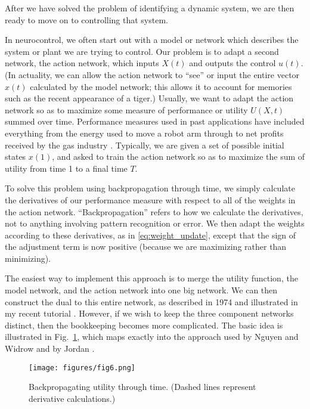 \documentclass[journal]{IEEEtran} %
\begin{document}
After we have solved the problem of identifying a dynamic system, we are then ready to move on to controlling that system.

In neurocontrol, we often start out with a model or network which describes the system or plant we are trying to control. Our problem is to adapt a second network, the action network, which inputs $X(t)$ and outputs the control $u(t)$. (In actuality, we can allow the action network to ``see'' or input the entire vector $x(t)$ calculated by the model network; this allows it to account for memories such as the recent appearance of a tiger.) Usually, we want to adapt the action network so as to maximize some measure of performance or utility $U(X, t)$ summed over time. Performance measures used in past applications have included everything from the energy used to move a robot arm \cite{Jordan:1989, Kawato:1990} through to net profits received by the gas industry \cite{Werbos:1987b}. Typically, we are given a set of possible initial states $x(1)$, and asked to train the action network so as to maximize the sum of utility from time 1 to a final time $T$.

To solve this problem using backpropagation through time, we simply calculate the derivatives of our performance measure with respect to all of the weights in the action network. ``Backpropagation'' refers to how we calculate the derivatives, not to anything involving pattern recognition or error. We then adapt the weights according to these derivatives, as in \eqref{eq:weight_update}, except that the sign of the adjustment term is now positive (because we are maximizing rather than minimizing).

The easiest way to implement this approach is to merge the utility function, the model network, and the action network into one big network. We can then construct the dual to this entire network, as described in 1974 \cite{Werbos:1974} and illustrated in my recent tutorial \cite{Werbos:1987b}. However, if we wish to keep the three component networks distinct, then the bookkeeping becomes more complicated. The basic idea is illustrated in Fig.~\ref{fig:utility_bptt}, which maps exactly into the approach used by Nguyen and Widrow \cite{Nguyen:1990} and by Jordan \cite{Jordan:1989}.

\begin{figure}[htb]
    \centering
    \texttt{[image: figures/fig6.png]} %
    \caption{Backpropagating utility through time. (Dashed lines represent derivative calculations.)}
    \label{fig:utility_bptt}
\end{figure}
\end{document}

